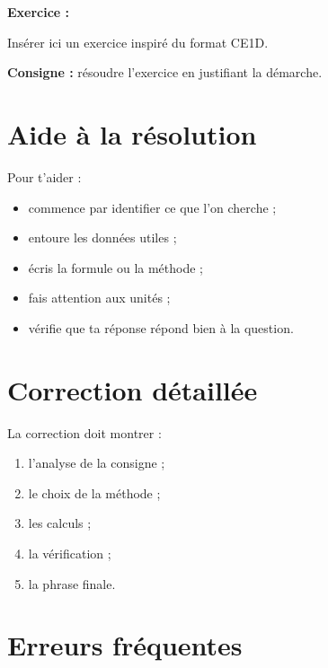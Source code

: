 \documentclass[11pt,a4paper]{article}
\begin{document}
\begin{cadreenonce}
\textbf{Exercice :}

Insérer ici un exercice inspiré du format CE1D.

\medskip

\textbf{Consigne :} résoudre l’exercice en justifiant la démarche.
\end{cadreenonce}

\section{Aide à la résolution}

\begin{cadreaide}
Pour t’aider :
\begin{itemize}
    \item commence par identifier ce que l’on cherche ;
    \item entoure les données utiles ;
    \item écris la formule ou la méthode ;
    \item fais attention aux unités ;
    \item vérifie que ta réponse répond bien à la question.
\end{itemize}
\end{cadreaide}

\section{Correction détaillée}

\begin{cadresolution}
La correction doit montrer :
\begin{enumerate}
    \item l’analyse de la consigne ;
    \item le choix de la méthode ;
    \item les calculs ;
    \item la vérification ;
    \item la phrase finale.
\end{enumerate}
\end{cadresolution}

\section{Erreurs fréquentes}
\end{document}
